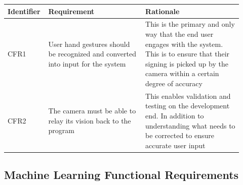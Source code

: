 \documentclass[12pt]{article}
\begin{document}
\renewcommand{\arraystretch}{1.2}
\noindent \begin{tabularx}{\textwidth}{p{0.12\linewidth}|p{0.4\linewidth}|p{0.4\linewidth}}
\toprule
\textbf{Identifier} & \textbf{Requirement} & \textbf{Rationale}\\
\midrule
CFR1 
& User hand gestures should be recognized and converted into input for the system 
& This is the primary and only way that the end user engages with the system. This is to ensure that 
their signing is picked up by the camera within a certain degree of accuracy\\
\hline
CFR2
& The camera must be able to relay its vision back to the program
& This enables validation and testing on the development end. In addition to understanding what needs 
to be corrected to ensure accurate user input\\
\bottomrule
\end{tabularx}

\subsection{Machine Learning Functional Requirements}
\end{document}
